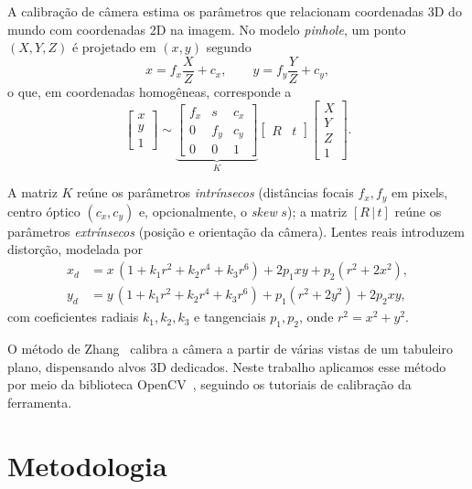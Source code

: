 \documentclass[conference]{IEEEtran}
\begin{document}
A calibração de câmera estima os parâmetros que relacionam coordenadas
3D do mundo com coordenadas 2D na imagem. No modelo \emph{pinhole}, um
ponto $(X,Y,Z)$ é projetado em $(x,y)$ segundo
\begin{equation}
x = f_x \frac{X}{Z} + c_x, \qquad y = f_y \frac{Y}{Z} + c_y,
\end{equation}
o que, em coordenadas homogêneas, corresponde a
\begin{equation}
\begin{bmatrix} x \\ y \\ 1 \end{bmatrix}
\sim
\underbrace{\begin{bmatrix} f_x & s & c_x \\ 0 & f_y & c_y \\ 0 & 0 & 1 \end{bmatrix}}_{K}
\begin{bmatrix} R & t \end{bmatrix}
\begin{bmatrix} X \\ Y \\ Z \\ 1 \end{bmatrix}.
\end{equation}

A matriz $K$ reúne os parâmetros \emph{intrínsecos} (distâncias focais
$f_x,f_y$ em pixels, centro óptico $(c_x,c_y)$ e, opcionalmente, o
\emph{skew} $s$); a matriz $[R\,|\,t]$ reúne os parâmetros
\emph{extrínsecos} (posição e orientação da câmera). Lentes reais
introduzem distorção, modelada por
\begin{equation}
\begin{aligned}
x_d &= x\,(1 + k_1 r^2 + k_2 r^4 + k_3 r^6) + 2p_1 xy + p_2(r^2+2x^2),\\
y_d &= y\,(1 + k_1 r^2 + k_2 r^4 + k_3 r^6) + p_1(r^2+2y^2) + 2p_2 xy,
\end{aligned}
\end{equation}
com coeficientes radiais $k_1,k_2,k_3$ e tangenciais $p_1,p_2$, onde
$r^2 = x^2+y^2$.

O método de Zhang~\cite{zhang2000} calibra a câmera a partir de várias
vistas de um tabuleiro plano, dispensando alvos 3D dedicados. Neste
trabalho aplicamos esse método por meio da biblioteca
OpenCV~\cite{opencv}, seguindo os tutoriais de calibração da
ferramenta.

\section{Metodologia}
\end{document}

